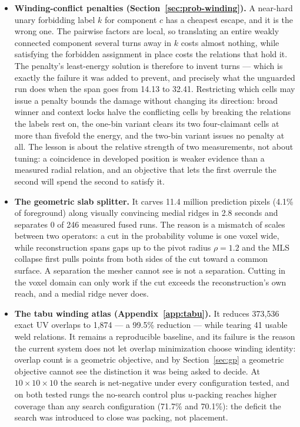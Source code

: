 \begin{itemize}
  \setlength{\itemsep}{3pt}
  \item \textbf{Winding-conflict penalties (Section~\ref{sec:prob-winding}).} A near-hard unary forbidding label $k$ for component $c$ has a cheapest escape, and it is the wrong one. The pairwise factors are local, so translating an entire weakly connected component several turns away in $k$ costs almost nothing, while satisfying the forbidden assignment in place costs the relations that hold it. The penalty's least-energy solution is therefore to invent turns --- which is exactly the failure it was added to prevent, and precisely what the unguarded run does when the span goes from 14.13 to 32.41. Restricting which cells may issue a penalty bounds the damage without changing its direction: broad winner and context locks halve the conflicting cells by breaking the relations the labels rest on, the one-bin variant clears its two four-claimant cells at more than fivefold the energy, and the two-bin variant issues no penalty at all. The lesson is about the relative strength of two measurements, not about tuning: a coincidence in developed position is weaker evidence than a measured radial relation, and an objective that lets the first overrule the second will spend the second to satisfy it.

  \item \textbf{The geometric slab splitter.} It carves 11.4 million prediction pixels (4.1\% of foreground) along visually convincing medial ridges in 2.8 seconds and separates 0 of 246 measured fused runs. The reason is a mismatch of scales between two operators: a cut in the probability volume is one voxel wide, while reconstruction spans gaps up to the pivot radius $\rho=1.2$ and the MLS collapse first pulls points from both sides of the cut toward a common surface. A separation the mesher cannot see is not a separation. Cutting in the voxel domain can only work if the cut exceeds the reconstruction's own reach, and a medial ridge never does.

  \item \textbf{The tabu winding atlas (Appendix~\ref{app:tabu}).} It reduces 373,536 exact UV overlaps to 1,874 --- a 99.5\% reduction --- while tearing 41 usable weld relations. It remains a reproducible baseline, and its failure is the reason the current system does not let overlap minimization choose winding identity: overlap count is a geometric objective, and by Section~\ref{sec:gp} a geometric objective cannot see the distinction it was being asked to decide. At $10\times10\times10$ the search is net-negative under every configuration tested, and on both tested rungs the no-search control plus $u$-packing reaches higher coverage than any search configuration (71.7\% and 70.1\%): the deficit the search was introduced to close was packing, not placement.


\end{itemize}
